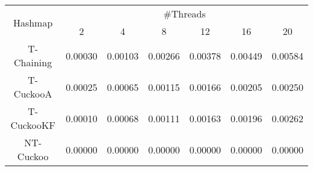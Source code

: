 \begin{tabular}{|c|c|c|c|c|c|c|}
\hline
\multirow{2}{*}{Hashmap} & \multicolumn{6}{c|}{\#Threads}\\\cline{2-7}& 2 & 4 & 8 & 12 & 16 & 20\\
\hline
\hline
T-Chaining & 0.00030 & 0.00103 & 0.00266 & 0.00378 & 0.00449 & 0.00584\\
T-CuckooA & 0.00025 & 0.00065 & 0.00115 & 0.00166 & 0.00205 & 0.00250\\
T-CuckooKF & 0.00010 & 0.00068 & 0.00111 & 0.00163 & 0.00196 & 0.00262\\
NT-Cuckoo & 0.00000 & 0.00000 & 0.00000 & 0.00000 & 0.00000 & 0.00000\\
\hline
\end{tabular}
